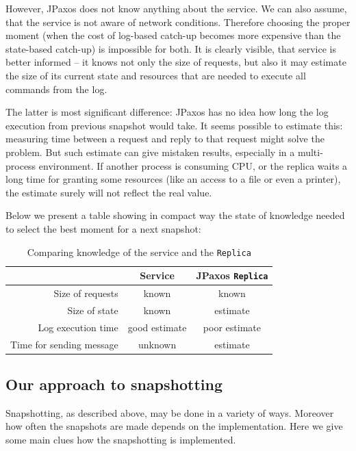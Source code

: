 However, JPaxos does not know anything about the service. We can also assume, that the service is not aware of network conditions. Therefore choosing the proper moment (when the cost of log-based catch-up becomes more expensive than the state-based catch-up) is impossible for both. It is clearly visible, that service is better informed -- it knows not only the size of requests, but also it may estimate the size of its current state and resources that are needed to execute all commands from the log.

The latter is most significant difference: JPaxos has no idea how long the log execution from previous snapshot would take. It seems possible to estimate this: measuring time between a request and reply to that request might solve the problem. But such estimate can give mistaken results, especially in a multi-process environment. If another process is consuming CPU, or the replica waits a long time for granting some resources (like an access to a file or even a printer), the estimate surely will not reflect the real value.

Below we present a table showing in compact way the state of knowledge needed to select the best moment for a next snapshot:

\begin{table}[h]
\small \centering
\begin{tabular}{r|c|c|}
\cline{2-3}
 & Service & JPaxos \texttt{Replica} \\ \hline 
\multicolumn{1}{|r|}{Size of requests} & known & known \\ \hline
\multicolumn{1}{|r|}{Size of state } & known & estimate \\ \hline
\multicolumn{1}{|r|}{Log execution time} & good estimate & poor estimate \\ \hline
\multicolumn{1}{|r|}{Time for sending message} & unknown & estimate \\ \hline
\end{tabular}
\caption{Comparing knowledge of the service and the \texttt{Replica}}
\vspace{-1em}
\end{table}

\subsection{Our approach to snapshotting}
\label{subsec:our_approach_to_snapshotting}
Snapshotting, as described above, may be done in a variety of ways. Moreover how often the snapshots are made depends on the implementation. Here we give some main clues how the snapshotting is implemented.

